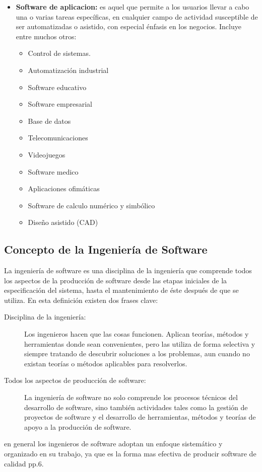 \documentclass[12pt]{book} %
\begin{document}
\begin{itemize}
			\item \textbf{Software de aplicacion:} es aquel que permite a los usuarios llevar a cabo una o varias tareas específicas, en
			cualquier campo de actividad susceptible de ser automatizadas o asistido, con especial énfasis en los negocios. Incluye entre
			muchos otros:
			\begin{multicols}{2}
				\begin{itemize}
					\item Control de sistemas.
					\item Automatización industrial
					\item Software educativo
					\item Software empresarial
					\item Base de datos
					\item Telecomunicaciones
					\item Videojuegos
					\item Software medico
					\item Aplicaciones ofimáticas
					\item Software de calculo numérico y simbólico
					\item Diseño asistido (\textsc{CAD})
				\end{itemize}
			\end{multicols}
		\end{itemize}
		
	\subsection{Concepto de la Ingeniería de Software}
		La ingeniería de software es una disciplina de la ingeniería que comprende todos los aspectos de la producción de software desde 
		las etapas iniciales de la especificación del sistema, hasta el mantenimiento de éste después de que se utiliza.
		En esta definición existen dos frases clave:
		\begin{description}
			\item[Disciplina de la ingeniería: ] Los ingenieros hacen que las cosas funcionen. Aplican teorías, métodos y herramientas 	
			donde sean convenientes, pero las utiliza de forma selectiva y siempre tratando de descubrir soluciones a los problemas, aun 
			cuando no existan teorías o métodos aplicables para resolverlos.
			\item[Todos los aspectos de producción de software: ] La ingeniería de software no solo comprende los procesos técnicos del 
			desarrollo de software, sino también actividades tales como la gestión de proyectos de software y el desarrollo de 
			herramientas, métodos y teorías de apoyo a la producción de software.
		\end{description}		 
		en general los ingenieros de software adoptan un enfoque sistemático y organizado en su trabajo, ya que es la forma mas efectiva
		de producir software de calidad \cite{IngSoft} pp.6.
\newpage
\end{document}
